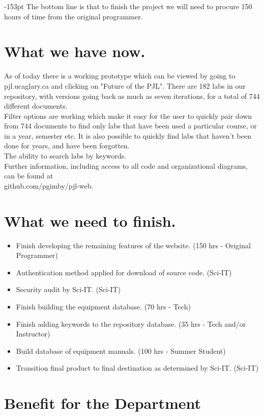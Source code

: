 \begin{adjustwidth}{}{-153pt}
The bottom line is that to finish the project we will need to procure 150 hours of time from the original programmer. 


\section{\bf What we have now.}
As of today there is a working prototype which can be viewed by going to pjl.ucaglary.ca and clicking on "Future of the PJL". There are 182 labs in our repository, with versions going back as much as seven iterations, for a total of 744 different documents. \\

Filter options are working which make it easy for the user to quickly pair down from 744 documents to find only labs that have been used a particular course, or in a year, semester etc. It is also possible to quickly find labs that haven't been done for years, and have been forgotten. \\

The ability to search labs by keywords.\\

Further information, including access to all code and organizational diagrams, can be found at\\ github.com/pgimby/pjl-web.


\section{\bf What we need to finish.}

\begin{itemize}
\item Finish developing the remaining features of the website. (150 hrs - Original Programmer)
\item Authentication method applied for download of source code. (Sci-IT)
\item Security audit by Sci-IT. (Sci-IT)
\item Finish building the equipment database. (70 hrs - Tech)
\item Finish adding keywords to the repository database. (35 hrs - Tech and/or Instructor)
\item Build database of equipment manuals. (100 hrs - Summer Student)
\item Transition final product to final destination as determined by Sci-IT. (Sci-IT)
\end{itemize}


\section{\bf Benefit for the Department}


\end{adjustwidth}
